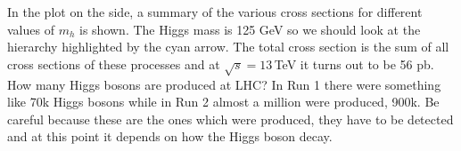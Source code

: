 \documentclass[../main.tex]{subfiles}
\begin{document}
In the plot on the side, a summary of the various cross sections for different values of $m_h$ is shown. The Higgs mass is 125 GeV so we should look at the hierarchy highlighted by the cyan arrow. The total cross section is the sum of all cross sections of these processes and at $\sqrt{s}=13$\,TeV it turns out to be 56 pb. How many Higgs bosons are produced at LHC? In Run 1 there were something like 70k Higgs bosons while in Run 2 almost a million were produced, 900k. Be careful because these are the ones which were produced, they have to be detected and at this point it depends on how the Higgs boson decay.
\end{document}
